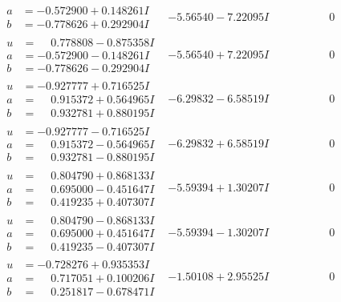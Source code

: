 \documentclass[1p]{elsarticle_modified}
\theoremstyle{definition}
\begin{document}
$$\begin{array}{c|c|c}
\begin{aligned}
a &= -0.572900 + 0.148261 I \\
b &= -0.778626 + 0.292904 I\end{aligned}
 & -5.56540 - 7.22095 I & \phantom{-0.000000 } 0 \\ \hline\begin{aligned}
u &= \phantom{-}0.778808 - 0.875358 I \\
a &= -0.572900 - 0.148261 I \\
b &= -0.778626 - 0.292904 I\end{aligned}
 & -5.56540 + 7.22095 I & \phantom{-0.000000 } 0 \\ \hline\begin{aligned}
u &= -0.927777 + 0.716525 I \\
a &= \phantom{-}0.915372 + 0.564965 I \\
b &= \phantom{-}0.932781 + 0.880195 I\end{aligned}
 & -6.29832 - 6.58519 I & \phantom{-0.000000 } 0 \\ \hline\begin{aligned}
u &= -0.927777 - 0.716525 I \\
a &= \phantom{-}0.915372 - 0.564965 I \\
b &= \phantom{-}0.932781 - 0.880195 I\end{aligned}
 & -6.29832 + 6.58519 I & \phantom{-0.000000 } 0 \\ \hline\begin{aligned}
u &= \phantom{-}0.804790 + 0.868133 I \\
a &= \phantom{-}0.695000 - 0.451647 I \\
b &= \phantom{-}0.419235 + 0.407307 I\end{aligned}
 & -5.59394 + 1.30207 I & \phantom{-0.000000 } 0 \\ \hline\begin{aligned}
u &= \phantom{-}0.804790 - 0.868133 I \\
a &= \phantom{-}0.695000 + 0.451647 I \\
b &= \phantom{-}0.419235 - 0.407307 I\end{aligned}
 & -5.59394 - 1.30207 I & \phantom{-0.000000 } 0 \\ \hline\begin{aligned}
u &= -0.728276 + 0.935353 I \\
a &= \phantom{-}0.717051 + 0.100206 I \\
b &= \phantom{-}0.251817 - 0.678471 I\end{aligned}
 & -1.50108 + 2.95525 I & \phantom{-0.000000 } 0 \\ \hline\begin{aligned}

\end{aligned}
\end{array}$$
\end{document}
